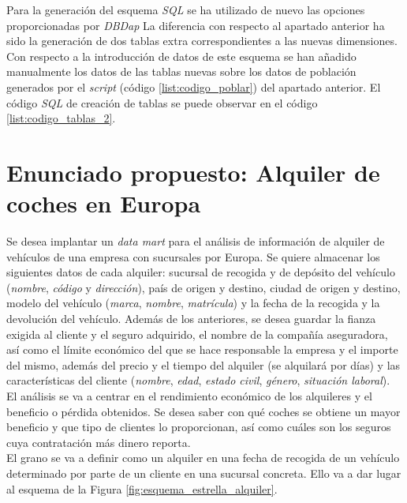 \documentclass{article}
\begin{document}
Para la generación del esquema \textit{SQL} se ha utilizado de nuevo las opciones proporcionadas por \textit{DBDap} La diferencia con respecto al apartado anterior ha sido la generación de dos tablas extra correspondientes a las nuevas dimensiones.\\

Con respecto a la introducción de datos de este esquema se han añadido manualmente los datos de las tablas nuevas sobre los datos de población generados por el \textit{script} (código \ref{list:codigo_poblar}) del apartado anterior. El código \textit{SQL} de creación de tablas se puede observar en el código \ref{list:codigo_tablas_2}. \\

\newpage
\section{Enunciado propuesto: Alquiler de coches en Europa}

Se desea implantar un \textit{data mart} para el análisis de información de alquiler de vehículos de una empresa con sucursales por Europa. Se quiere almacenar los siguientes datos de cada alquiler: sucursal de recogida y de depósito del vehículo (\textit{nombre}, \textit{código} y \textit{dirección}), país de origen y destino, ciudad de origen y destino, modelo del vehículo (\textit{marca}, \textit{nombre}, \textit{matrícula}) y la fecha de la recogida y la devolución del vehículo. Además de los anteriores, se desea guardar la fianza exigida al cliente y el seguro adquirido, el nombre de la compañía aseguradora, así como el límite económico del que se hace responsable la empresa y el importe del mismo, además del precio y el tiempo del alquiler (se alquilará por días) y las características del cliente (\textit{nombre}, \textit{edad}, \textit{estado civil}, \textit{género}, \textit{situación laboral}).\\

El análisis se va a centrar en el rendimiento económico de los alquileres y el beneficio o pérdida obtenidos. Se desea saber con qué coches se obtiene un mayor beneficio y que tipo de clientes lo proporcionan, así como cuáles son los seguros cuya contratación más dinero reporta.\\

El grano se va a definir como un alquiler en una fecha de recogida de un vehículo determinado por parte de un cliente en una sucursal concreta. Ello va a dar lugar al esquema de la Figura \ref{fig:esquema_estrella_alquiler}.\\
\end{document}
